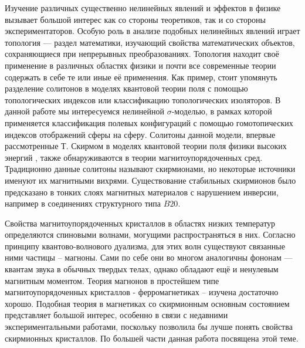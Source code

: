 \documentclass[a4paper,article,14pt]{extarticle}
\begin{document}


\tableofcontents
\pagebreak


Изучение различных существенно нелинейных явлений и эффектов в физике вызывает большой интерес как со стороны теоретиков, так и со стороны экспериментаторов.  Особую роль в анализе подобных нелинейных явлений играет топология --- раздел математики, изучающий свойства математических объектов, сохраняющиеся при непрерывных преобразованиях. Топология находит своё применение в различных областях физики и почти все современные теории содержать в себе те или иные её применения. Как пример, стоит упомянуть разделение солитонов в моделях квантовой теории поля \cite{rajaraman} с помощью топологических индексов или классификацию топологических изоляторов. \cite{kitaev} В данной работе мы интересуемся нелинейной $\sigma$-моделью, в рамках которой применяется классификация полевых конфигураций с помощью гомотопических индексов отображений сферы на сферу. Солитоны данной модели, впервые рассмотренные Т. Скирмом в моделях квантовой теории поля физики высоких энергий \cite{skyrme}, также обнаруживаются в теории магнитоупорядоченных сред. Традиционно данные солитоны называют скирмионами, но некоторые источники \cite{bogdanov} именуют их магнитными вихрями. Существование стабильных скирмионов было предсказано в тонких слоях магнитных материалов с нарушением инверсии, например в соединениях структурного типа $B20$.\cite{roslerBogdanov, bogdanov}


Свойства магнитоупорядоченных кристаллов в областях низких температур определяются спиновыми волнами, \cite{ahiezer} могущими распространяться в них. Согласно принципу квантово-волнового дуализма, для этих волн существуют связанные ними частицы – магноны. Сами по себе они во многом аналогичны фононам --- квантам звука в обычных твердых телах, однако обладают ещё и ненулевым магнитным моментом. Теория магнонов в простейшем типе магнитоупорядоченных кристаллов - ферромагнетиках – изучена достаточно хорошо. Подобная теория в магнетиках со скирмионным основным состоянием представляет большой интерес, особенно в связи с недавними экспериментальными работами, \cite{mulhbauer, yu} поскольку позволила бы лучше понять свойства скирмионных кристаллов. По большей части данная работа посвящена этой теме.
\end{document}
